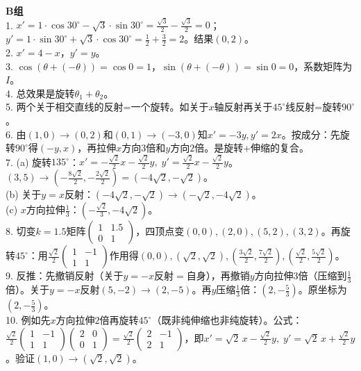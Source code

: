 \noindent\textbf{B组}\\
1. $x'=1\cdot\cos30^\circ-\sqrt3\cdot\sin30^\circ=\frac{\sqrt3}{2}-\frac{\sqrt3}{2}=0$；$y'=1\cdot\sin30^\circ+\sqrt3\cdot\cos30^\circ=\frac12+\frac32=2$。结果$(0,2)$。\\
2. $x'=4-x$，$y'=y$。\\
3. $\cos(\theta+(-\theta))=\cos0=1$，$\sin(\theta+(-\theta))=\sin0=0$，系数矩阵为$I$。\\
4. 总效果是旋转$\theta_1+\theta_2$。\\
5. 两个关于相交直线的反射=一个旋转。如关于$x$轴反射再关于$45^\circ$线反射=旋转$90^\circ$。\\
6. 由$(1,0)\to(0,2)$和$(0,1)\to(-3,0)$知$x'=-3y,y'=2x$。按成分：先旋转$90^\circ$得$(-y,x)$，再拉伸$x$方向$3$倍和$y$方向$2$倍。是旋转+伸缩的复合。\\
7. (a) 旋转$135^\circ$：$x'=-\frac{\sqrt2}{2}x-\frac{\sqrt2}{2}y,\;y'=\frac{\sqrt2}{2}x-\frac{\sqrt2}{2}y$。$(3,5)\to(-\frac{8\sqrt2}{2},-\frac{2\sqrt2}{2})=(-4\sqrt2,-\sqrt2)$。\\
(b) 关于$y=x$反射：$(-4\sqrt2,-\sqrt2)\to(-\sqrt2,-4\sqrt2)$。\\
(c) $x$方向拉伸$\frac13$：$(-\frac{\sqrt2}{3},-4\sqrt2)$。\\
8. 切变$k=1.5$矩阵$\begin{pmatrix}1&1.5\\0&1\end{pmatrix}$，四顶点变$(0,0),(2,0),(5,2),(3,2)$。再旋转$45^\circ$：用$\frac{\sqrt2}{2}\begin{pmatrix}1&-1\\1&1\end{pmatrix}$作用得$(0,0),(\sqrt2,\sqrt2),(\frac{3\sqrt2}{2},\frac{7\sqrt2}{2}),(\frac{\sqrt2}{2},\frac{5\sqrt2}{2})$。\\
9. 反推：先撤销反射（关于$y=-x$反射$=$自身），再撤销$y$方向拉伸$3$倍（压缩到$\frac13$倍）。关于$y=-x$反射$(5,-2)\to(2,-5)$。再$y$压缩$\frac13$倍：$(2,-\frac53)$。原坐标为$(2,-\frac53)$。\\
10. 例如先$x$方向拉伸$2$倍再旋转$45^\circ$（既非纯伸缩也非纯旋转）。公式：$\frac{\sqrt2}{2}\begin{pmatrix}1&-1\\1&1\end{pmatrix}\begin{pmatrix}2&0\\0&1\end{pmatrix}=\frac{\sqrt2}{2}\begin{pmatrix}2&-1\\2&1\end{pmatrix}$，即$x'=\sqrt2\,x-\frac{\sqrt2}{2}y,\;y'=\sqrt2\,x+\frac{\sqrt2}{2}y$。验证$(1,0)\to(\sqrt2,\sqrt2)$。

